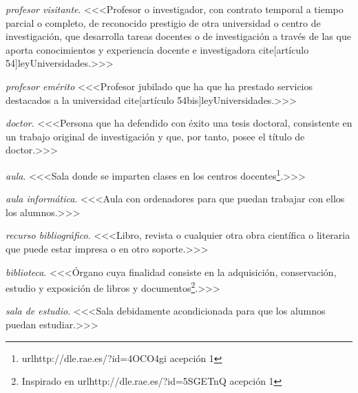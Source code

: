     \item \emph{profesor visitante}. <<<Profesor o investigador, con contrato temporal a tiempo parcial o completo, de reconocido prestigio de otra universidad o centro de investigación, que desarrolla tareas docentes o de investigación a través de las que aporta conocimientos y experiencia docente e investigadora cite[artículo 54]{leyUniversidades}.>>>

    \item \emph{profesor emérito} <<<Profesor jubilado que ha que ha prestado servicios destacados a la universidad cite[artículo 54bis]{leyUniversidades}.>>>

    \item \emph{doctor}. <<<Persona que ha defendido con éxito una tesis doctoral, consistente en un trabajo original de investigación y que, por tanto, posee el título de doctor.>>>

    \item \emph{aula}. <<<Sala donde se imparten clases en los centros docentes\footnote{url{http://dle.rae.es/?id=4OCO4gi} acepción 1}.>>>

    \item \emph{aula informática}. <<<Aula con ordenadores para que puedan trabajar con ellos los alumnos.>>>

    \item \emph{recurso bibliográfico}. <<<Libro, revista o cualquier otra obra científica o literaria que puede estar impresa o en otro soporte.>>>

    \item \emph{biblioteca}. <<<Órgano cuya finalidad consiste en la adquisición, conservación, estudio y exposición de libros y documentos\footnote{Inspirado en url{http://dle.rae.es/?id=5SGETnQ} acepción 1}.>>>

    \item \emph{sala de estudio}. <<<Sala debidamente acondicionada para que los alumnos puedan estudiar.>>> 

{}

